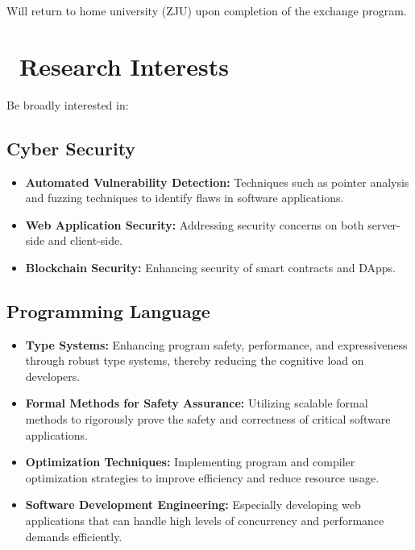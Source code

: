 \documentclass{resume}
\begin{document}
Will return to home university (ZJU) upon completion of the exchange program.

\section{\faLightbulbO\ Research Interests}
Be broadly interested in:
\subsection{Cyber Security}
\begin{itemize}
  \item \textbf{Automated Vulnerability Detection:} Techniques such as pointer analysis and fuzzing techniques to identify flaws in software applications.
  \item \textbf{Web Application Security:} Addressing security concerns on both server-side and client-side.
  \item \textbf{Blockchain Security:} Enhancing security of smart contracts and DApps.
\end{itemize}

\subsection{Programming Language}
\begin{itemize}
  \item \textbf{Type Systems:} Enhancing program safety, performance, and expressiveness through robust type systems, thereby reducing the cognitive load on developers.
  \item \textbf{Formal Methods for Safety Assurance:} Utilizing scalable formal methods to rigorously prove the safety and correctness of critical software applications.
  \item \textbf{Optimization Techniques:} Implementing program and compiler optimization strategies to improve efficiency and reduce resource usage.
  \item \textbf{Software Development Engineering:} Especially developing web applications that can handle high levels of concurrency and performance demands efficiently.
\end{itemize}
\end{document}
